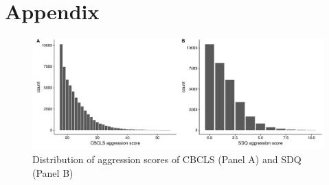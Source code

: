 \section{Appendix}
\label{sec:appendix_longhera}

\begin{figure}[htpb]
  \centering
  \includegraphics[width=0.7\linewidth]{longHera/figure/aggression_hist_score.pdf}
  \caption[Distribution of aggression scores]{Distribution of aggression scores of CBCLS (Panel A) and SDQ (Panel B)}\label{fig:hist_aggression}
\end{figure}
